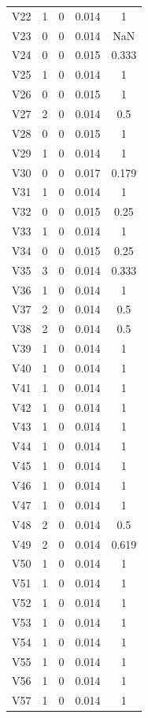 \documentclass[a4paper, 12pt, openright, oneside, german, french, english, brazil]{abntex2}
\begin{document}
\begin{SingleSpace}
\begin{footnotesize}
\begin{center}
\begin{longtable}{c c c c c}
					V22 & 1 & 0 & 0.014 & 1 \\ 
					V23 & 0 & 0 & 0.014 & NaN \\ 
					V24 & 0 & 0 & 0.015 & 0.333 \\ 
					V25 & 1 & 0 & 0.014 & 1 \\ 
					V26 & 0 & 0 & 0.015 & 1 \\ 
					V27 & 2 & 0 & 0.014 & 0.5 \\ 
					V28 & 0 & 0 & 0.015 & 1 \\ 
					V29 & 1 & 0 & 0.014 & 1 \\ 
					V30 & 0 & 0 & 0.017 & 0.179 \\ 
					V31 & 1 & 0 & 0.014 & 1 \\ 
					V32 & 0 & 0 & 0.015 & 0.25 \\ 
					V33 & 1 & 0 & 0.014 & 1 \\ 
					V34 & 0 & 0 & 0.015 & 0.25 \\ 
					V35 & 3 & 0 & 0.014 & 0.333 \\ 
					V36 & 1 & 0 & 0.014 & 1 \\ 
					V37 & 2 & 0 & 0.014 & 0.5 \\ 
					V38 & 2 & 0 & 0.014 & 0.5 \\ 
					V39 & 1 & 0 & 0.014 & 1 \\ 
					V40 & 1 & 0 & 0.014 & 1 \\ 
					V41 & 1 & 0 & 0.014 & 1 \\ 
					V42 & 1 & 0 & 0.014 & 1 \\ 
					V43 & 1 & 0 & 0.014 & 1 \\ 
					V44 & 1 & 0 & 0.014 & 1 \\ 
					V45 & 1 & 0 & 0.014 & 1 \\ 
					V46 & 1 & 0 & 0.014 & 1 \\ 
					V47 & 1 & 0 & 0.014 & 1 \\ 
					V48 & 2 & 0 & 0.014 & 0.5 \\ 
					V49 & 2 & 0 & 0.014 & 0.619 \\ 
					V50 & 1 & 0 & 0.014 & 1 \\ 
					V51 & 1 & 0 & 0.014 & 1 \\ 
					V52 & 1 & 0 & 0.014 & 1 \\ 
					V53 & 1 & 0 & 0.014 & 1 \\ 
					V54 & 1 & 0 & 0.014 & 1 \\ 
					V55 & 1 & 0 & 0.014 & 1 \\ 
					V56 & 1 & 0 & 0.014 & 1 \\ 
					V57 & 1 & 0 & 0.014 & 1 \\ 

\end{longtable}
\end{center}
\end{footnotesize}
\end{SingleSpace}
\end{document}
